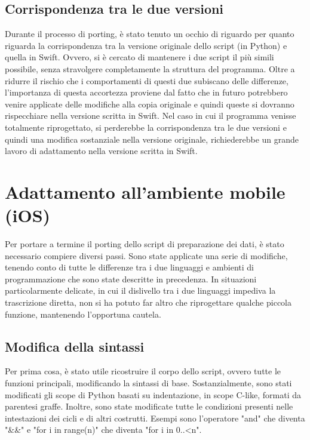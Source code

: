 \subsection{Corrispondenza tra le due versioni}

Durante il processo di porting, è stato tenuto un occhio di riguardo per quanto
riguarda la corrispondenza tra la versione originale dello script (in Python) e 
quella in Swift. Ovvero, si è cercato di mantenere i due script il più simili 
possibile, senza stravolgere completamente la struttura del programma. Oltre
a ridurre il rischio che i comportamenti di questi due subiscano delle differenze,
l'importanza di questa accortezza proviene dal fatto che in futuro potrebbero
venire applicate delle modifiche alla copia originale e quindi queste si dovranno
rispecchiare nella versione scritta in Swift. Nel caso in cui il programma venisse
totalmente riprogettato, si perderebbe la corrispondenza tra le due versioni e 
quindi una modifica sostanziale nella versione originale, richiederebbe un grande
lavoro di adattamento nella versione scritta in Swift.

\section{Adattamento all'ambiente mobile (iOS)}

Per portare a termine il porting dello script di preparazione dei dati,
è stato necessario compiere diversi passi. Sono state applicate una serie 
di modifiche, tenendo conto di tutte le differenze tra i due linguaggi 
e ambienti di programmazione che sono state descritte in precedenza.
In situazioni particolarmente delicate, in cui il dislivello tra i due
linguaggi impediva la trascrizione diretta, non si ha potuto far altro
che riprogettare qualche piccola funzione, mantenendo l'opportuna 
cautela.

\subsection{Modifica della sintassi}

Per prima cosa, è stato utile ricostruire il corpo dello script, ovvero 
tutte le funzioni principali, modificando la sintassi di base. Sostanzialmente, 
sono stati modificati gli scope di Python basati su indentazione, in scope
C-like, formati da parentesi graffe. Inoltre, sono state modificate tutte le
condizioni presenti nelle intestazioni dei cicli e di altri costrutti. Esempi
sono l'operatore "and" che diventa "\&\&" e "for i in range(n)" che diventa
"for i in 0..<n".

